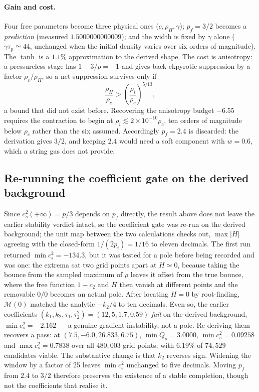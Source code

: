 \documentclass[a4paper,11pt]{article}
\begin{document}
\paragraph{Gain and cost.} Four free parameters become three physical ones ($c,\rho_H,\gamma$); $p_f=3/2$ becomes a \emph{prediction} (measured $1.5000000000009$); and the width is fixed by $\gamma$ alone ($\gamma\tau_p\simeq44$, unchanged when the initial density varies over six orders of magnitude). The $\tanh$ is a $1.1\%$ approximation to the derived shape. The cost is anisotropy: a pressureless stage has $1-3/p=-1$ and gives back ekpyrotic suppression by a factor $\rho_c/\rho_H$, so a net suppression survives only if
\begin{equation}
\frac{\rho_H}{\rho_c}>\left(\frac{\rho_i}{\rho_c}\right)^{5/13},
\end{equation}
a bound that did not exist before. Recovering the anisotropy budget $-6.55$ requires the contraction to begin at $\rho_i\lesssim2\times10^{-10}\rho_c$, ten orders of magnitude below $\rho_c$ rather than the six assumed. Accordingly $p_f=2.4$ is discarded: the derivation gives $3/2$, and keeping $2.4$ would need a soft component with $w=0.6$, which a string gas does not provide.

\subsection{Re-running the coefficient gate on the derived background}
 Since $c_s^2(+\infty)=p/3$ depends on $p_f$ directly, the result above does not leave the earlier stability verdict intact, so the coefficient gate was re-run on the derived background; the unit map between the two calculations checks out, $\max|H|$ agreeing with the closed-form $1/(2p_i)=1/16$ to eleven decimals. The first run returned $\min c_s^2=-134.3$, but it was tested for a pole before being recorded and was one: the extrema sat two grid points apart at $H\simeq0$, because taking the bounce from the sampled maximum of $\rho$ leaves it offset from the true bounce, where the free function $1-c_2$ and $H$ then vanish at different points and the removable $0/0$ becomes an actual pole. After locating $H=0$ by root-finding, $\mathcal M(0)$ matched the analytic $-k_2/4$ to ten decimals. Even so, the earlier coefficients $(k_1,k_2,\tau_1,\tau_2^2)=(12,5,1.7,0.59)$ \emph{fail} on the derived background, $\min c_s^2=-2.162$ --- a genuine gradient instability, not a pole. Re-deriving them recovers a pass: at $(7.5,-6.0,26.833,6.75)$, $\min Q_s=3.0000$, $\min c_s^2=0.09258$ and $\max c_s^2=0.7838$ over all $480{,}003$ grid points, with $6.19\%$ of $74{,}529$ candidates viable. The substantive change is that $k_2$ reverses sign. Widening the window by a factor of 25 leaves $\min c_s^2$ unchanged to five decimals. Moving $p_f$ from $2.4$ to $3/2$ therefore preserves the existence of a stable completion, though not the coefficients that realise it.
\end{document}
